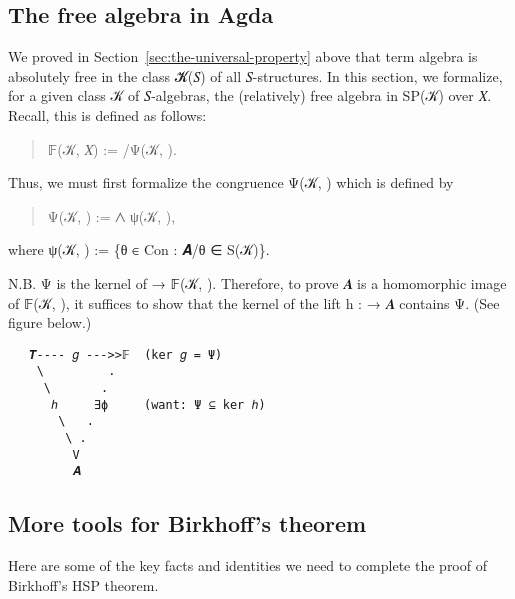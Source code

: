 \documentclass[a4paper,USenglish,cleveref,autoref,thm-restate]{lipics-v2019}
\begin{document}
\subsection{The free algebra in Agda}\label{sec:the-free-algebra-in-agda}
We proved in Section~\ref{sec:the-universal-property} above that term algebra \TX is absolutely free in the class \AB 𝓚(\AB 𝑆) of all \AB 𝑆-structures. In this section, we formalize, for a given class \AB 𝒦 of \AB 𝑆-algebras, the (relatively) free algebra in SP(\AB 𝒦) over \AB 𝑋. Recall, this is defined as follows:
\begin{quote}
𝔽(\AB 𝒦, \AB 𝑋) := \TX/\AB Ψ(\AB 𝒦, \TX).
\end{quote}
Thus, we must first formalize the congruence \AB Ψ(\AB 𝒦, \TX) which is defined by
\begin{quote}
Ψ(\AB 𝒦, \TX) := ⋀ ψ(\AB 𝒦, \TX),
\end{quote}
where ψ(\AB 𝒦, \TX) := \{θ ∈ Con \TX : \AB 𝑨/θ ∈ S(\AB 𝒦)\}.
\begin{code}\end{code}

N.B. Ψ is the kernel of \TX → 𝔽(\AB 𝒦, \TX). Therefore, to prove \AB 𝑨 is a homomorphic image of 𝔽(\AB 𝒦, \TX), it suffices to show that the kernel of the lift \AB h : \TX → \AB 𝑨 contains Ψ. (See figure below.)

\begin{verbatim}
   𝑻---- 𝑔 --->>𝔽  (ker 𝑔 = Ψ)
    \         .
     \       .
      ℎ     ∃ϕ     (want: Ψ ⊆ ker ℎ)
       \   .
        \ .
         V
         𝑨
\end{verbatim}

\subsection{More tools for Birkhoff's theorem}\label{sec:more-tools-for-birkhoffs-theorem}
Here are some of the key facts and identities we need to complete the proof of Birkhoff's HSP theorem.
\begin{code}\end{code}

\end{document}
